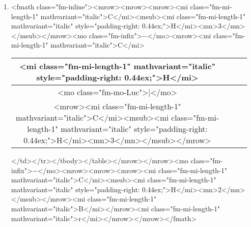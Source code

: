 \documentclass{article}
\begin{document}
\begin{enumerate}[label=(\alph*)]
\item <fmath class="fm-inline"><mrow><mrow><mrow><mi class="fm-mi-length-1" mathvariant="italic">C</mi><msub><mi class="fm-mi-length-1" mathvariant="italic" style="padding-right: 0.44ex;">H</mi><mn>3</mn></msub></mrow><mo class="fm-infix">−</mo><mrow><mi class="fm-mi-length-1" mathvariant="italic">C</mi>\begin{tabular}{|c|c|c|c|}
\hline
<mi class="fm-mi-length-1" mathvariant="italic" style="padding-right: 0.44ex;">H</mi> \\
\hline
<mo class="fm-mo-Luc">|</mo> \\
\hline
<mrow><mi class="fm-mi-length-1" mathvariant="italic">C</mi><msub><mi class="fm-mi-length-1" mathvariant="italic" style="padding-right: 0.44ex;">H</mi><mn>3</mn></msub></mrow> \\
\hline
\end{tabular}
</td></tr></tbody></table></mrow></mrow><mo class="fm-infix">−</mo><mrow><mrow><mrow><mi class="fm-mi-length-1" mathvariant="italic">C</mi><msub><mi class="fm-mi-length-1" mathvariant="italic" style="padding-right: 0.44ex;">H</mi><mn>2</mn></msub></mrow><mi class="fm-mi-length-1" mathvariant="italic">B</mi></mrow><mi class="fm-mi-length-1" mathvariant="italic">r</mi></mrow></mrow></fmath>
\end{enumerate}
\newpage
\end{document}

